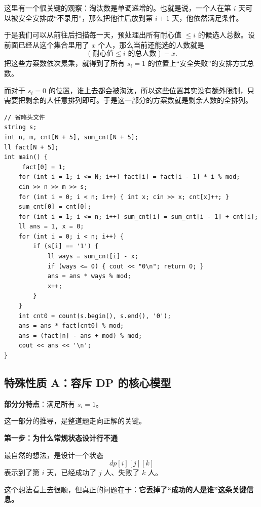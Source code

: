 \documentclass{book}
\begin{document}
这里有一个很关键的观察：淘汰数是单调递增的。也就是说，一个人在第 $i$ 天可以被安全安排成“不录用”，那么把他往后放到第 $i+1$ 天，他依然满足条件。

于是我们可以从前往后扫描每一天，预处理出所有耐心值 $\le i$ 的候选人总数。设前面已经从这个集合里用了 $x$ 个人，那么当前还能选的人数就是
\[
(\text{耐心值}\le i\text{ 的总人数}) - x.
\]
把这些方案数依次累乘，就得到了所有 $s_i = 1$ 的位置上“安全失败”的安排方式总数。

而对于 $s_i = 0$ 的位置，谁上去都会被淘汰，所以这些位置其实没有额外限制，只需要把剩余的人任意排列即可。于是这一部分的方案数就是剩余人数的全排列。

\begin{lstlisting}[style = code]
// 省略头文件
string s;
int n, m, cnt[N + 5], sum_cnt[N + 5];
ll fact[N + 5];
int main() {
     fact[0] = 1;
    for (int i = 1; i <= N; i++) fact[i] = fact[i - 1] * i % mod;
    cin >> n >> m >> s;
    for (int i = 0; i < n; i++) { int x; cin >> x; cnt[x]++; }
    sum_cnt[0] = cnt[0];
    for (int i = 1; i <= n; i++) sum_cnt[i] = sum_cnt[i - 1] + cnt[i];
    ll ans = 1, x = 0;
    for (int i = 0; i < n; i++) {
        if (s[i] == '1') {
            ll ways = sum_cnt[i] - x;
            if (ways <= 0) { cout << "0\n"; return 0; }
            ans = ans * ways % mod;
            x++;
        }
    }
    int cnt0 = count(s.begin(), s.end(), '0');
    ans = ans * fact[cnt0] % mod;
    ans = (fact[n] - ans + mod) % mod;
    cout << ans << '\n';
}
\end{lstlisting}


\newpage
\subsection{特殊性质 A：容斥 DP 的核心模型}

\textbf{部分分特点}：满足所有 $s_i = 1$。

这一部分的推导，是整道题走向正解的关键。

\par\medskip
\noindent\textbf{第一步：为什么常规状态设计行不通}
\par\medskip

最自然的想法，是设计一个状态
\[
dp[i][j][k]
\]
表示到了第 $i$ 天，已经成功了 $j$ 人、失败了 $k$ 人。

这个想法看上去很顺，但真正的问题在于：\textbf{它丢掉了“成功的人是谁”这条关键信息。}
\end{document}
